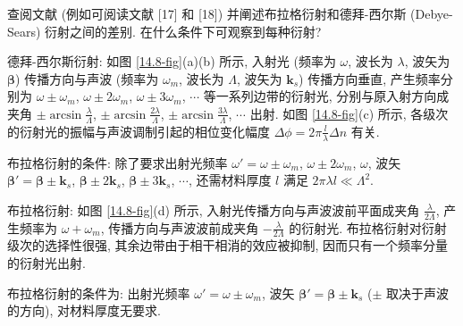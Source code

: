 \documentclass{note}
\begin{document}
\begin{exe}
    查阅文献 (例如可阅读文献 [17] 和 [18]) 并阐述布拉格衍射和德拜-西尔斯 (Debye-Sears) 衍射之间的差别. 在什么条件下可观察到每种衍射?
\end{exe}
\begin{sol}
    德拜-西尔斯衍射: 如图 \ref{14.8-fig}(a)(b) 所示, 入射光 (频率为 $\omega$, 波长为 $\lambda$, 波矢为 $\bm{\beta}$) 传播方向与声波 (频率为 $\omega_m$, 波长为 $\Lambda$, 波矢为 $\bm{k}_s$) 传播方向垂直, 产生频率分别为 $\omega\pm\omega_m$, $\omega\pm 2\omega_m$, $\omega\pm 3\omega_m$, $\cdots$ 等一系列边带的衍射光, 分别与原入射方向成夹角 $\pm\arcsin\frac{\lambda}{\Lambda}$, $\pm\arcsin\frac{2\lambda}{\Lambda}$, $\pm\arcsin\frac{3\lambda}{\Lambda}$, $\cdots$ 出射. 如图 \ref{14.8-fig}(c) 所示, 各级次的衍射光的振幅与声波调制引起的相位变化幅度 $\Delta\phi=2\pi\frac{l}{\lambda}\Delta n$ 有关.

    布拉格衍射的条件: 除了要求出射光频率 $\omega'=\omega\pm\omega_m$, $\omega\pm 2\omega_m$, $\omega$, 波矢 $\bm{\beta}'=\bm{\beta}\pm\bm{k}_s$, $\bm{\beta}\pm 2\bm{k}_s$, $\bm{\beta}\pm 3\bm{k}_s$, $\cdots$, 还需材料厚度 $l$ 满足 $2\pi\lambda l\ll\Lambda^2$.

    布拉格衍射: 如图 \ref{14.8-fig}(d) 所示, 入射光传播方向与声波波前平面成夹角 $\frac{\lambda}{2\Lambda}$, 产生频率为 $\omega+\omega_m$, 传播方向与声波波前成夹角 $-\frac{\lambda}{2\Lambda}$ 的衍射光. 布拉格衍射对衍射级次的选择性很强, 其余边带由于相干相消的效应被抑制, 因而只有一个频率分量的衍射光出射.

    布拉格衍射的条件为: 出射光频率 $\omega'=\omega\pm\omega_m$, 波矢 $\bm{\beta}'=\bm{\beta}\pm\bm{k}_s$ ($\pm$ 取决于声波的方向), 对材料厚度无要求.


\end{sol}
\end{document}
